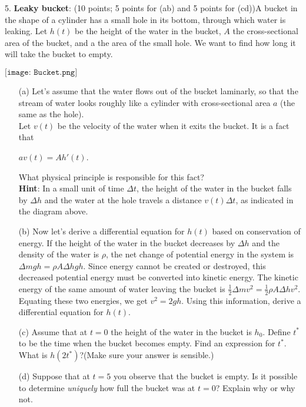 \documentclass[12pt,letterpaper]{hmcpset}
\begin{document}
\begin{problem}
5. \textbf{Leaky bucket}: (10 points; 5 points for (ab) and 5 points for (cd))A bucket in the shape
of a cylinder has a small hole in its bottom, through which water is leaking. Let $h(t)$
be the height of the water in the bucket, $A$ the cross-sectional area of the bucket, and a
the area of the small hole. We want to find how long it will take the bucket to empty.

\begin{center}
    
$\texttt{[image: Bucket.png]}$
\end{center}

\begin{enumerate}
    \item[(a)] Let’s assume that the water flows out of the bucket laminarly, so that the stream of
water looks roughly like a cylinder with cross-sectional area $a$ (the same as the hole).\\ 
Let $v(t)$ be the velocity of the water when it exits the bucket. It is a fact that
\begin{center}
    $av(t) = Ah'(t)$.
\end{center}
What physical principle is responsible for this fact?\\
\textbf{Hint}: In a small unit of time $\Delta t$, the height of the water in the bucket falls by $\Delta h$ and
the water at the hole travels a distance $v(t)\Delta t$, as indicated in the diagram above.
    \item[(b)] Now let’s derive a differential equation for $h(t)$ based on conservation of energy. If the
height of the water in the bucket decreases by $\Delta h$ and the density of the water is $\rho$,
the net change of potential energy in the system is$ \Delta mgh = \rho A\Delta hgh$. Since energy
cannot be created or destroyed, this decreased potential energy must be converted into
kinetic energy. The kinetic energy of the same amount of water leaving the bucket
is $\frac{1}{2}\Delta mv^2 =\frac{1}{2}\rho A\Delta hv^2$. Equating these two energies, we get $v^2 = 2gh$. Using this
information, derive a differential equation for $h(t)$.
    \item[(c)] Assume that at $t = 0$ the height of the water in the bucket is $h_0$. Define $t^\ast$ to be the time when the bucket becomes empty. Find an expression for $t^\ast$. What is $h(2t^\ast)$?(Make sure your answer is sensible.)
    \item[(d)] Suppose that at $t = 5$ you observe that the bucket is empty. Is it possible to determine
\textit{uniquely} how full the bucket was at $t = 0$? Explain why or why not.
\end{enumerate}

\end{problem}
\newpage
\end{document}
